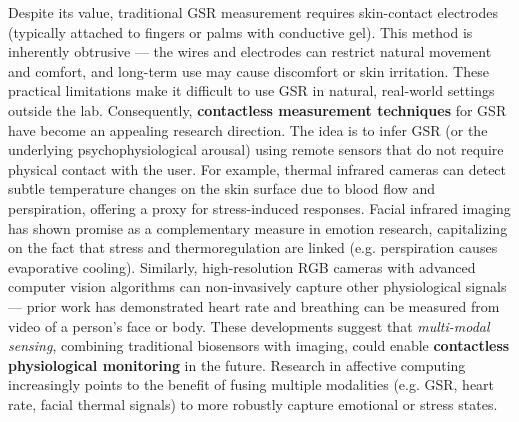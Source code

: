 Despite its value, traditional GSR measurement requires skin-contact
electrodes (typically attached to fingers or palms with conductive
gel)\cite{ref4}.
This method is inherently obtrusive --- the wires and electrodes can
restrict natural movement and comfort, and long-term use may cause
discomfort or skin
irritation\cite{ref5}\cite{ref6}.
These practical limitations make it difficult to use GSR in natural,
real-world settings outside the lab. Consequently, \textbf{contactless
measurement techniques} for GSR have become an appealing research
direction\cite{ref7}.
The idea is to infer GSR (or the underlying psychophysiological arousal)
using remote sensors that do not require physical contact with the user.
For example, thermal infrared cameras can detect subtle temperature
changes on the skin surface due to blood flow and perspiration, offering
a proxy for stress-induced
responses\cite{ref8}.
Facial infrared imaging has shown promise as a complementary measure in
emotion research, capitalizing on the fact that stress and
thermoregulation are linked (e.g. perspiration causes evaporative
cooling)\cite{ref9}.
Similarly, high-resolution RGB cameras with advanced computer vision
algorithms can non-invasively capture other physiological signals ---
prior work has demonstrated heart rate and breathing can be measured
from video of a person's face or
body\cite{ref10}\cite{ref11}.
These developments suggest that \textit{multi-modal sensing}, combining
traditional biosensors with imaging, could enable \textbf{contactless
physiological monitoring} in the future. Research in affective
computing increasingly points to the benefit of fusing multiple
modalities (e.g. GSR, heart rate, facial thermal signals) to more
robustly capture emotional or stress
states\cite{ref1}\cite{ref12}.

